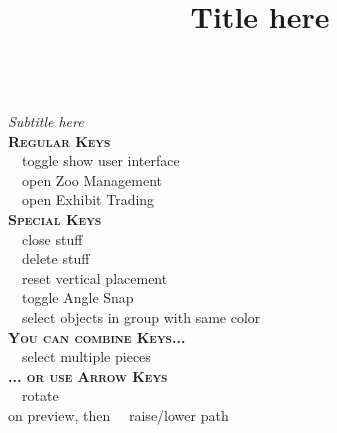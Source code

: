 \documentclass[12pt,twoside]{article}
\title{Title here}
\makeatletter
\newcommand{\command}[2]{#1~\dotfill{}~#2\\} %
\newcommand{\sectiontitle}[1]{\textsc{\textbf{#1}} \ \textcolor{DarkGray}{\hrulefill}\\} %
\renewcommand{\maketitle}{{\centering{\Large\bfseries\@title}}\\}
\makeatother
\begin{document}
\begin{multicols*}{3}

\maketitle
\emph{Subtitle here}\\

\sectiontitle{Regular Keys}
\command{}{toggle show user interface}
\command{}{open Zoo Management}
\command{}{open Exhibit Trading}

\sectiontitle{Special Keys}
\command{\keys{\esc}}{close stuff}
\command{\keys{\del}}{delete stuff}
\command{\keys{\shift}}{reset vertical placement}
\command{\keys{\SPACE}}{toggle Angle Snap}
\command{}{select objects in group with same color}

\sectiontitle{You can combine Keys...}
\command{}{select multiple pieces}

\sectiontitle{... or use Arrow Keys}
\command{}{rotate}
\command{ on preview, then \keys{\arrowkeyup/\arrowkeydown}}{raise/lower path}

\end{multicols*}
\end{document}
